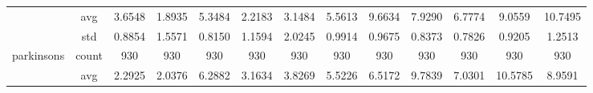\begin{table}[htbp]
{\begin{tabular}{rcccccccccccc}
			                                   & avg                                    & 3.6548                                                                             & \cellcolor[rgb]{ .776,  .937,  .808}\textcolor[rgb]{ 0,  .38,  0}{1.8935} & 5.3484                                                                    & 2.2183                                                                    & 3.1484                                        & 5.5613                                      & 9.6634                                         & 7.9290                                         & 6.7774                                         & 9.0559                                         & 10.7495                                        \\
			                                   & std                                    & 0.8854                                                                             & 1.5571                                                                    & 0.8150                                                                    & 1.1594                                                                    & 2.0245                                        & 0.9914                                      & 0.9675                                         & 0.8373                                         & 0.7826                                         & 0.9205                                         & 1.2513                                         \\
			parkinsons                         & count                                  & 930                                                                                & 930                                                                       & 930                                                                       & 930                                                                       & 930                                           & 930                                         & 930                                            & 930                                            & 930                                            & 930                                            & 930                                            \\
			                                   & avg                                    & 2.2925                                                                             & \cellcolor[rgb]{ .776,  .937,  .808}\textcolor[rgb]{ 0,  .38,  0}{2.0376} & 6.2882                                                                    & 3.1634                                                                    & 3.8269                                        & 5.5226                                      & 6.5172                                         & 9.7839                                         & 7.0301                                         & 10.5785                                        & 8.9591                                         \\

\end{tabular}}
\end{table}
